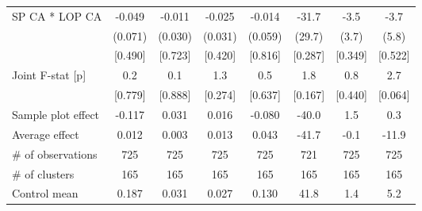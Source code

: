 \begin{tabular}{lccccccc}
SP CA * LOP CA & -0.049\hphantom{-} & -0.011\hphantom{-} & -0.025\hphantom{-} & -0.014\hphantom{-} & -31.7\hphantom{-} & -3.5\hphantom{-} & -3.7\hphantom{-} \\
 & (0.071) & (0.030) & (0.031) & (0.059) & (29.7) & (3.7) & (5.8) \\
 & [0.490] & [0.723] & [0.420] & [0.816] & [0.287] & [0.349] & [0.522] \\
Joint F-stat [p] & 0.2 & 0.1 & 1.3 & 0.5 & 1.8 & 0.8 & 2.7 \\
 & [0.779] & [0.888] & [0.274] & [0.637] & [0.167] & [0.440] & [0.064] \\
\cmidrule(lr){1-8}
Sample plot effect & -0.117 & 0.031 & 0.016 & -0.080 & -40.0 & 1.5 & 0.3 \\
Average effect & 0.012 & 0.003 & 0.013 & 0.043 & -41.7 & -0.1 & -11.9 \\
\hline
\# of observations & 725 & 725 & 725 & 725 & 721 & 725 & 725 \\
\# of clusters & 165 & 165 & 165 & 165 & 165 & 165 & 165 \\
Control mean & 0.187 & 0.031 & 0.027 & 0.130 & 41.8 & 1.4 & 5.2 \\
\hline
\end{tabular}
